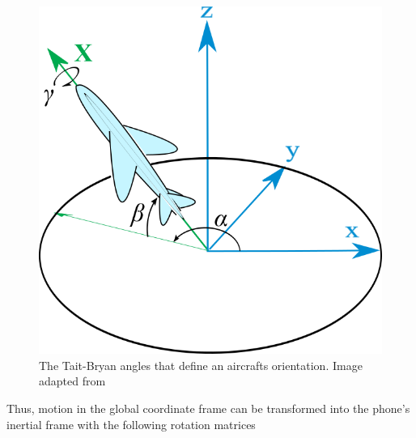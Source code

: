 \documentclass[10pt]{article}
\begin{document}
\begin{figure}
  \begin{center}
  \includegraphics[width=.3\textwidth]{../images/plane-with-enu-embedded-axes.png}
  \caption{\label{fig:aircraft-axes}The Tait-Bryan angles that define an aircrafts orientation. Image adapted from \cite{wikipedia:angles}} 
  \end{center}
\end{figure}

Thus, motion in the global coordinate frame can be transformed into the phone's inertial frame with the following rotation matrices

\def\ca{\cos{\alpha}}
\def\sa{\sin\alpha}
\def\cb{\cos\beta}
\def\sb{\sin\beta}
\def\cg{\cos\gamma}
\def\sg{\sin\gamma}
\end{document}
